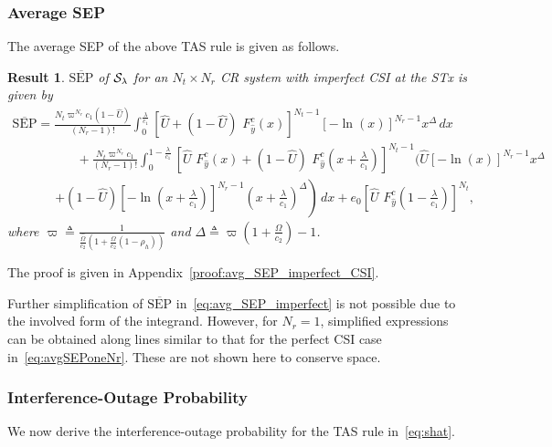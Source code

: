 \documentclass[12pt,draftcls,peerreview,onecolumn]{IEEEtran}
\newtheorem{result}{{\bf Result}}
\newcommand{\define}{\triangleq}
\newcommand{\SEP}{\text{SEP}}
\newcommand{\lam}{\lambda}
\newcommand{\Nt}{{N_t}}
\newcommand{\Nr}{{N_r}}
\newcommand{\cone}{c_{1}}
\newcommand{\ctwo}{c_{2}}
\newcommand{\lambym}{\frac{\lam}{\cone}}
\newcommand{\al}{\ctwo}
\newcommand{\snr}{\Omega}
\newcommand{\snrbyal}[1][]{\frac{\snr#1}{\al}}
\newcommand{\un}{U}
\newcommand{\zerosep}{e_0}
\newcommand{\callamrule}{{\cal S_{{\lam}}}}
\newcommand{\avgSEP}{\overline{\SEP}}
\newcommand{\unhat}{\widehat{\un}}
\newcommand{\snrhat}{\widehat{\snr}}
\newcommand{\yhat}{\hat{y}}
\newcommand{\snrhatbyal}[1][]{\frac{\snrhat#1}{\al}}
\newcommand{\rhoh}{\rho_h}
\newcommand{\Tc}{\frac{1}{\snrhatbyal\left(1 + \snrbyal\left(1 - \rhoh \right)  \right) }}
\newcommand{\T}{\varpi}
\newcommand{\Dc}{\T \left( 1 + \snrbyal\right) -1}
\newcommand{\ccdfyhatrv}[1]{F^{c}_{\yhat}\left(#1 \right) }
\newcommand{\D}{\Delta}
\newcommand{\yhattimespdfyNr}{\left[-\ln\left(x\right)\right]^{\Nr-1}x^{\D}} %
\newcommand{\yhatpluslamtimespdfyNr}{\left[-\ln\left({x+\lambym}\right)\right]^{\Nr-1}\left(x+\lambym\right)^{\!\!\D}} %
\newcommand{\unccdfyhat}[2]{{#1}\,\,\ccdfyhatrv{#2}}
\begin{document}
\subsubsection{ Average SEP} The average SEP of the above TAS rule is given as follows. 

\begin{result}
\label{thm:avg_SEP_imperfect}
$\avgSEP$ of $\callamrule$ for an $\Nt\times\Nr$ CR system with imperfect CSI at the STx is given by
\begin{multline}
\label{eq:avg_SEP_imperfect}
\avgSEP = \frac{\Nt \T^{\Nr}\cone(1-\unhat)}{(\Nr-1)!} \int_{0}^{\lambym} \left[\unhat + \unccdfyhat{(1-\unhat)}{x}\right]^{\Nt-1} \yhattimespdfyNr\, dx\\
\hspace{60pt} + \frac{\Nt \T^{\Nr}\cone}{(\Nr-1)!} \int_{0}^{1-\lambym}
\!\left[\unccdfyhat{\unhat}{x} + \unccdfyhat{(1-\unhat)}{x+\lambym} \right]^{\Nt-1} \!\!\Bigg(\unhat\yhattimespdfyNr  \\ 
\hspace{40pt}\left. + (1-\unhat)\yhatpluslamtimespdfyNr\right)\, dx 
+\zerosep\left[\unccdfyhat{\unhat}{1-\lambym}\right]^{\Nt}\!\!,\!\!
\end{multline}
where $\T \define \Tc$ and $\D \define \Dc$.	
\end{result}
\begin{IEEEproof}
	The proof is given in Appendix~\ref{proof:avg_SEP_imperfect_CSI}.
\end{IEEEproof}

Further simplification of $\avgSEP$ in~\eqref{eq:avg_SEP_imperfect} is not possible due to the involved form of the integrand. However, for $\Nr=1$, simplified expressions can be obtained along lines similar to that for the perfect CSI case in~\eqref{eq:avgSEPoneNr}. These are not shown here to conserve space.



\subsubsection{ Interference-Outage Probability} We now derive the interference-outage probability for the TAS rule in~\eqref{eq:shat}.
\end{document}
